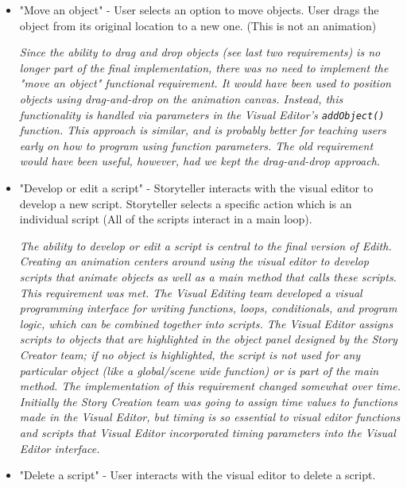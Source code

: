 \documentclass[12pt]{article}
\begin{document}
\begin{itemize}
\item "Move an object" - User selects an option to move objects. User drags the object from its original location to a new one. (This is not an animation)\ 

\textit{Since the ability to drag and drop objects (see last two requirements) is no longer part of the final implementation, there was no need to implement the "move an object" functional requirement. It would have been used to position objects using drag-and-drop on the animation canvas. Instead, this functionality is handled via parameters in the Visual Editor's \texttt{addObject()} function. This approach is similar, and is probably better for teaching users early on how to program using function parameters. The old requirement would have been useful, however, had we kept the drag-and-drop approach.}

\item "Develop or edit a script" - Storyteller interacts with the visual editor to develop a new script. Storyteller selects a specific action which is an individual script (All of the scripts interact in a main loop).\

\textit{The ability to develop or edit a script is central to the final version of Edith. Creating an animation centers around using the visual editor to develop scripts that animate objects as well as a main method that calls these scripts. This requirement was met. The Visual Editing team developed a visual programming interface for writing functions, loops, conditionals, and program logic, which can be combined together into scripts. The Visual Editor assigns scripts to objects that are highlighted in the object panel designed by the Story Creator team; if no object is highlighted, the script is not used for any particular object (like a global/scene wide function) or is part of the main method. The implementation of this requirement changed somewhat over time. Initially the Story Creation team was going to assign time values to functions made in the Visual Editor, but timing is so essential to visual editor functions and scripts that Visual Editor incorporated timing parameters into the Visual Editor interface.}

\item "Delete a script" - User interacts with the visual editor to delete a script.\ 


\end{itemize}
\end{document}
